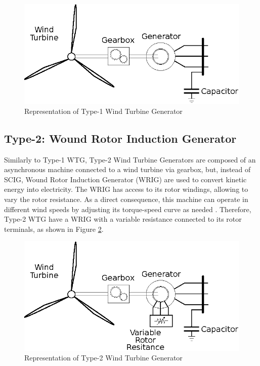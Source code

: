 \begin{figure}[h]
	\caption{Representation of Type-1 Wind Turbine Generator}
	\begin{center}
		\includegraphics[scale=1]{Images/Type1WTG.eps}
	\end{center}
	\label{fig: WTG1}
\end{figure}

\subsection{Type-2: Wound Rotor Induction Generator}

Similarly to Type-1 WTG, Type-2 Wind Turbine Generators are composed of an asynchronous machine connected to a wind turbine via gearbox, but, instead of SCIG, Wound Rotor Induction Generator (WRIG) are used to convert kinetic energy into electricity. The WRIG has access to its rotor windings, allowing to vary the rotor resistance. As a direct consequence, this machine can operate in different wind speeds by adjusting its torque-speed curve as needed \cite{Ellis2011}. Therefore, Type-2 WTG have a WRIG with a variable resistance connected to its rotor terminals, as shown in Figure \ref{fig: WTG2}.

\begin{figure}[h]
	\caption{Representation of Type-2 Wind Turbine Generator}
	\begin{center}
		\includegraphics[scale=1]{Images/Type2WTG.eps}
	\end{center}
	\label{fig: WTG2}
\end{figure}

